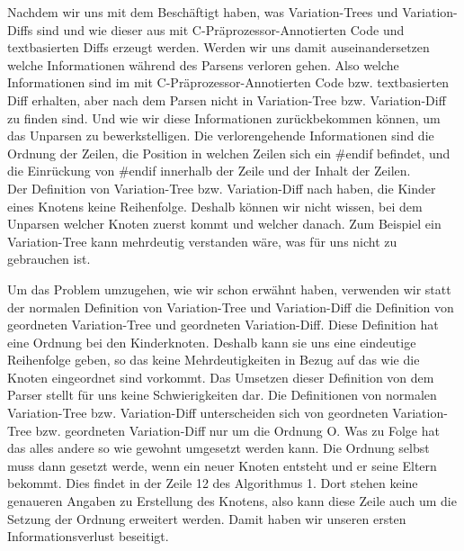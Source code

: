 Nachdem wir uns mit dem Beschäftigt haben, was Variation-Trees und Variation-Diffs sind und wie dieser aus mit C-Präprozessor-Annotierten Code und textbasierten Diffs erzeugt werden. Werden wir uns damit auseinandersetzen welche Informationen während des Parsens verloren gehen. Also welche Informationen sind im mit C-Präprozessor-Annotierten Code bzw. textbasierten Diff erhalten, aber nach dem Parsen nicht in Variation-Tree bzw. Variation-Diff zu finden sind. Und wie wir diese Informationen zurückbekommen können, um das Unparsen zu bewerkstelligen. Die verlorengehende Informationen sind die Ordnung der Zeilen, die Position in welchen Zeilen sich ein \#endif befindet, und die Einrückung von \#endif innerhalb der Zeile und der Inhalt der Zeilen.\\

Der Definition von Variation-Tree bzw. Variation-Diff nach haben, die Kinder eines Knotens keine Reihenfolge. Deshalb können wir nicht wissen, bei dem Unparsen welcher Knoten zuerst kommt und welcher danach. Zum Beispiel ein Variation-Tree kann mehrdeutig verstanden wäre, was für uns nicht zu gebrauchen ist.
\begin{figure}[H]
\end{figure}
Um das Problem umzugehen, wie wir schon erwähnt haben, verwenden wir statt der normalen Definition von Variation-Tree und Variation-Diff die Definition von geordneten Variation-Tree und geordneten Variation-Diff. Diese Definition hat eine Ordnung bei den Kinderknoten. Deshalb kann sie uns eine eindeutige Reihenfolge geben, so das keine Mehrdeutigkeiten in Bezug auf das wie die Knoten eingeordnet sind vorkommt. Das Umsetzen dieser Definition von dem Parser stellt für uns keine Schwierigkeiten dar. Die Definitionen von normalen Variation-Tree bzw. Variation-Diff unterscheiden sich von geordneten Variation-Tree bzw. geordneten Variation-Diff nur um die Ordnung O. Was zu Folge hat das alles andere so wie gewohnt umgesetzt werden kann. Die Ordnung selbst muss dann gesetzt werde, wenn ein neuer Knoten entsteht und er seine Eltern bekommt. Dies findet in der Zeile 12 des Algorithmus 1. Dort stehen keine genaueren Angaben zu Erstellung des Knotens, also kann diese Zeile auch um die Setzung der Ordnung erweitert werden. Damit haben wir unseren ersten Informationsverlust beseitigt.\\

